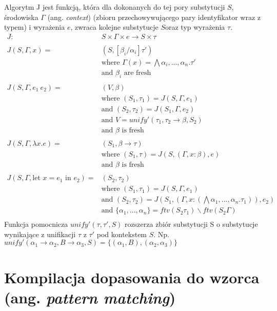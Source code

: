 \documentclass{article}
\begin{document}
Algorytm J jest funkcją, która dla dokonanych do tej pory substytucji $S$, środowiska $\Gamma$ (ang. \emph{context}) (zbioru przechowywującego pary identyfikator wraz z typem) i wyrażenia $e$, zwraca kolejne substytucje $S$oraz typ wyrażenia $\tau$.
\begin{equation}
  \begin{split}
    J :& S\times\Gamma\times e \rightarrow S\times\tau \\
    \\
    J(S,\Gamma,x) =& (S,[\beta_i/\alpha_i]\tau') \\
    &\text{where } \Gamma(x) = \bigwedge\alpha_i,...,\alpha_n.\tau' \\
    &\text{and } \beta_i \text{ are fresh} \\
    \\
    J(S,\Gamma,e_1\ e_2) =& (V,\beta) \\
    &\text{where } (S_1,\tau_1) = J(S,\Gamma,e_1) \\
    &\text{and } (S_2,\tau_2)=J(S_1,\Gamma,e_2) \\
    &\text{and } V = unify'(\tau_1,\tau_2\rightarrow\beta,S_2) \\
    &\text{and } \beta \text{ is fresh} \\
    \\
    J(S,\Gamma,\lambda x.e) =& (S_1,\beta\rightarrow\tau) \\
    &\text{where } (S_1,\tau)=J(S,(\Gamma,x:\beta),e) \\
    &\text{and } \beta \text{ is fresh} \\
    \\
    J(S,\Gamma,\text{let }x=e_1\text{ in }e_2) =& (S_2,\tau_2) \\
    &\text{where } (S_1,\tau_1)=J(S,\Gamma,e_1) \\
    &\text{and } (S_2,\tau_2)=J(S_1,(\Gamma,x:(\bigwedge\alpha_1,...,\alpha_n.\tau_1)),e_2) \\
    &\text{and } \{\alpha_1,...,\alpha_n\}=ftv(S_2\tau_1)\backslash ftv(S_2\Gamma) \\
  \end{split}
\end{equation}
Funkcja pomocnicza $unify'(\tau,\tau',S)$ rozszerza zbiór substytucji S o substytucje wynikające z unifikacji $\tau$ z $\tau'$ pod kontekstem $S$. Np. $unify'(\alpha_1\rightarrow\alpha_2,B\rightarrow\alpha_3,S) = \{(\alpha_1,B), (\alpha_2,\alpha_3)\}$

\section{Kompilacja dopasowania do wzorca (ang. \emph{pattern matching})}
\end{document}
